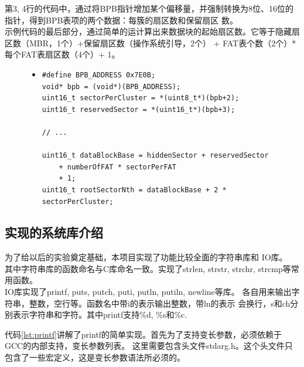 \documentclass[a4paper]{article}
\begin{document}
    第3, 4行的代码中，通过将BPB指针增加某个偏移量，并强制转换为8位、16位的指针，得到BPB表项的两个数据：每簇的扇区数和保留扇区
    数。 \\
    
    示例代码的最后部分，通过简单的运计算出来数据块的起始扇区数。它等于隐藏扇区数（MBR，1个）+保留扇区数（操作系统引导，2个） +
    FAT表个数（2个）* 每个FAT表扇区数（4个）+ 1。

    \begin{figure}[!hbt]
    \begin{itemize}
    \item[] \begin{lstlisting}[style=mystyle, label=lst:DBR, caption=操作系统引导的部分源码]
#define BPB_ADDRESS 0x7E0B;
void* bpb = (void*)(BPB_ADDRESS);
uint16_t sectorPerCluster = *(uint8_t*)(bpb+2);
uint16_t reservedSector = *(uint16_t*)(bpb+3);

// ...

uint16_t dataBlockBase = hiddenSector + reservedSector 
    + numberOfFAT * sectorPerFAT
    + 1;
uint16_t rootSectorNth = dataBlockBase + 2 * sectorPerCluster;

    \end{lstlisting}
    \end{itemize}
    \end{figure}

    \subsection{实现的系统库介绍}\label{sec:library}
    为了给以后的实验奠定基础，本项目实现了功能比较全面的字符串库和
    IO库。\\
    
    其中字符串库的函数命名与C库命名一致。实现了strlen, strstr, 
    strchr, strcmp等常用函数。\\
    
    IO库实现了printf, puts, putch, puti, putln, putiln, newline等库。
    各自用来输出字符串，整数，空行等。函数名中带i的表示输出整数，带ln的表示
    会换行，s和ch分别表示字符串和字符。其中printf支持\%d, \%s和\%c.

    代码\ref{lst:printf}讲解了printf的简单实现。首先为了支持变长参数，必须依赖于GCC的内部支持，变长参数列表。
    这里需要包含头文件stdarg.h。这个头文件只包含了一些宏定义，这是变长参数语法所必须的。\\ 
\end{document}
